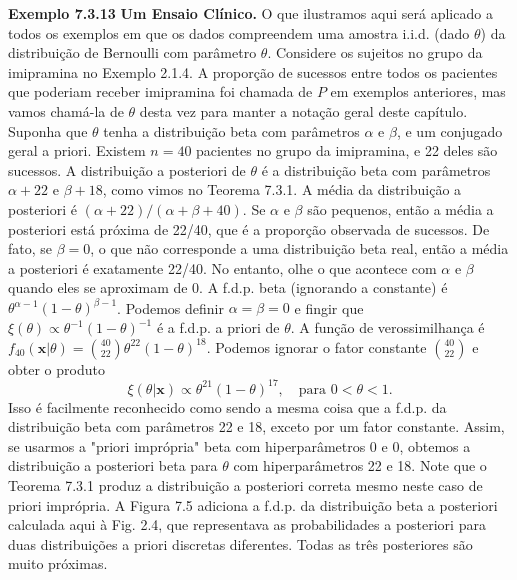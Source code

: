 \vspace{1cm}
\noindent\textbf{Exemplo 7.3.13} \quad \textbf{Um Ensaio Clínico.} O que ilustramos aqui será aplicado a todos os exemplos em que os dados compreendem uma amostra i.i.d. (dado $\theta$) da distribuição de Bernoulli com parâmetro $\theta$. Considere os sujeitos no grupo da imipramina no Exemplo 2.1.4. A proporção de sucessos entre todos os pacientes que poderiam receber imipramina foi chamada de $P$ em exemplos anteriores, mas vamos chamá-la de $\theta$ desta vez para manter a notação geral deste capítulo. Suponha que $\theta$ tenha a distribuição beta com parâmetros $\alpha$ e $\beta$, e um conjugado geral a priori. Existem $n=40$ pacientes no grupo da imipramina, e 22 deles são sucessos. A distribuição a posteriori de $\theta$ é a distribuição beta com parâmetros $\alpha+22$ e $\beta+18$, como vimos no Teorema 7.3.1. A média da distribuição a posteriori é $(\alpha+22)/(\alpha+\beta+40)$. Se $\alpha$ e $\beta$ são pequenos, então a média a posteriori está próxima de 22/40, que é a proporção observada de sucessos. De fato, se $\beta=0$, o que não corresponde a uma distribuição beta real, então a média a posteriori é exatamente 22/40. No entanto, olhe o que acontece com $\alpha$ e $\beta$ quando eles se aproximam de 0. A f.d.p. beta (ignorando a constante) é $\theta^{\alpha-1}(1-\theta)^{\beta-1}$. Podemos definir $\alpha=\beta=0$ e fingir que $\xi(\theta) \propto \theta^{-1}(1-\theta)^{-1}$ é a f.d.p. a priori de $\theta$. A função de verossimilhança é $f_{40}(\mathbf{x}|\theta) = \binom{40}{22}\theta^{22}(1-\theta)^{18}$. Podemos ignorar o fator constante $\binom{40}{22}$ e obter o produto
$$ \xi(\theta|\mathbf{x}) \propto \theta^{21}(1-\theta)^{17}, \quad \text{para } 0<\theta<1. $$
Isso é facilmente reconhecido como sendo a mesma coisa que a f.d.p. da distribuição beta com parâmetros 22 e 18, exceto por um fator constante. Assim, se usarmos a "priori imprópria" beta com hiperparâmetros 0 e 0, obtemos a distribuição a posteriori beta para $\theta$ com hiperparâmetros 22 e 18. Note que o Teorema 7.3.1 produz a distribuição a posteriori correta mesmo neste caso de priori imprópria. A Figura 7.5 adiciona a f.d.p. da distribuição beta a posteriori calculada aqui à Fig. 2.4, que representava as probabilidades a posteriori para duas distribuições a priori discretas diferentes. Todas as três posteriores são muito próximas.

\vspace{1cm}
\vspace{1cm}

